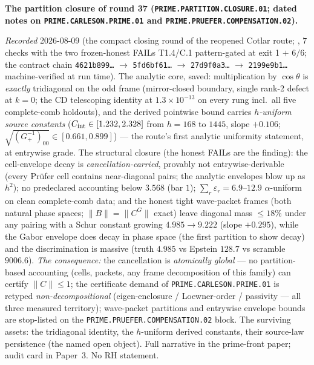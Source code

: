 \par\smallskip\noindent\textbf{The partition closure of round 37
(\texttt{PRIME.PARTITION.\allowbreak CLOSURE.01}; dated notes on
\texttt{PRIME.CARLESON.\allowbreak PRIME.01} and
\texttt{PRIME.PRUEFER.\allowbreak COMPENSATION.02}).}
{\sloppy
\emph{Recorded} 2026-08-09 (the compact closing round of the
reopened Cotlar route;
, $7$ checks with the
two frozen-honest FAILs T1.4/C.1 pattern-gated at exit 1 $+$
$6/6$; the contract chain \texttt{4621b899\ldots} $\to$
\texttt{5fd6bf61\ldots} $\to$ \texttt{27d9f0a3\ldots} $\to$
\texttt{2199e9b1\ldots} machine-verified at run time).  The
analytic core, saved: multiplication by $\cos\theta$ is
\emph{exactly} tridiagonal on the odd frame (mirror-closed
boundary, single rank-2 defect at $k = 0$; the CD telescoping
identity at $1.3\times10^{-13}$ on every rung incl.\ all five
complete-comb holdouts), and the derived pointwise bound carries
\emph{$h$-uniform source constants} ($C_{\rm int} \in [1.232,
2.328]$ from $h = 168$ to $1445$, slope $+0.106$;
$\sqrt{(G_+^{-1})_{00}} \in [0.661, 0.899]$) --- the route's
first analytic uniformity statement, at entrywise grade.  The
structural closure (the honest FAILs are the finding): the
cell-envelope decay is \emph{cancellation-carried}, provably not
entrywise-derivable (every Pr\"ufer cell contains near-diagonal
pairs; the analytic envelopes blow up as $h^2$); no predeclared
accounting below $3.568$ (bar $1$); $\sum_r \varepsilon_r =
6.9$--$12.9$ $\alpha$-uniform on clean complete-comb data; and
the honest tight wave-packet frames (both natural phase spaces;
$\|B\| = \|C^G\|$ exact) leave diagonal mass $\le 18\%$ under
any pairing with a Schur constant growing $4.985 \to 9.222$
(slope $+0.295$), while the Gabor envelope does decay in phase
space (the first partition to show decay) and the discrimination
is massive (truth $4.985$ vs Epstein $128.7$ vs scramble
$9006.6$).  \emph{The consequence:} the cancellation is
\emph{atomically global} --- no partition-based accounting
(cells, packets, any frame decomposition of this family) can
certify $\|C\| \le 1$; the certificate demand of
\texttt{PRIME.CARLESON.PRIME.01} is retyped
\emph{non-decompositional} (eigen-enclosure / Loewner-order /
passivity --- all three measured territory); wave-packet
partitions and entrywise envelope bounds are stop-listed on the
\texttt{PRIME.PRUEFER.COMPENSATION.02} block.  The surviving
assets: the tridiagonal identity, the $h$-uniform derived
constants, their source-law persistence (the named open object).
Full narrative in the prime-front paper; audit card in
Paper~3.  No RH statement.\par}


